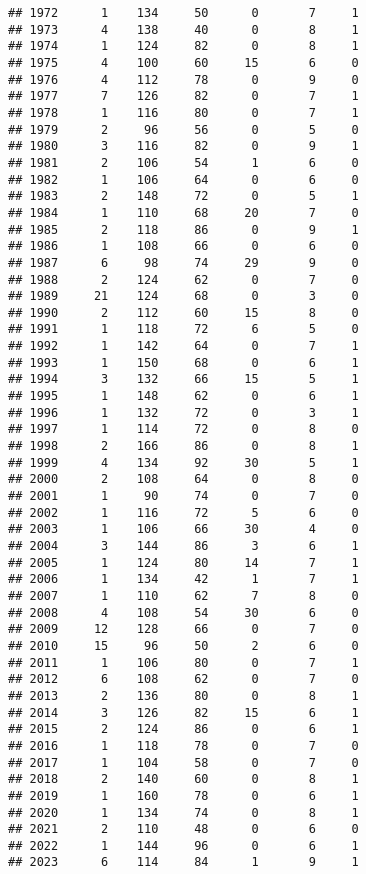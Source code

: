 \documentclass[
]{article}
\begin{document}
\begin{verbatim}
## 1972      1    134     50      0       7     1
## 1973      4    138     40      0       8     1
## 1974      1    124     82      0       8     1
## 1975      4    100     60     15       6     0
## 1976      4    112     78      0       9     0
## 1977      7    126     82      0       7     1
## 1978      1    116     80      0       7     1
## 1979      2     96     56      0       5     0
## 1980      3    116     82      0       9     1
## 1981      2    106     54      1       6     0
## 1982      1    106     64      0       6     0
## 1983      2    148     72      0       5     1
## 1984      1    110     68     20       7     0
## 1985      2    118     86      0       9     1
## 1986      1    108     66      0       6     0
## 1987      6     98     74     29       9     0
## 1988      2    124     62      0       7     0
## 1989     21    124     68      0       3     0
## 1990      2    112     60     15       8     0
## 1991      1    118     72      6       5     0
## 1992      1    142     64      0       7     1
## 1993      1    150     68      0       6     1
## 1994      3    132     66     15       5     1
## 1995      1    148     62      0       6     1
## 1996      1    132     72      0       3     1
## 1997      1    114     72      0       8     0
## 1998      2    166     86      0       8     1
## 1999      4    134     92     30       5     1
## 2000      2    108     64      0       8     0
## 2001      1     90     74      0       7     0
## 2002      1    116     72      5       6     0
## 2003      1    106     66     30       4     0
## 2004      3    144     86      3       6     1
## 2005      1    124     80     14       7     1
## 2006      1    134     42      1       7     1
## 2007      1    110     62      7       8     0
## 2008      4    108     54     30       6     0
## 2009     12    128     66      0       7     0
## 2010     15     96     50      2       6     0
## 2011      1    106     80      0       7     1
## 2012      6    108     62      0       7     0
## 2013      2    136     80      0       8     1
## 2014      3    126     82     15       6     1
## 2015      2    124     86      0       6     1
## 2016      1    118     78      0       7     0
## 2017      1    104     58      0       7     0
## 2018      2    140     60      0       8     1
## 2019      1    160     78      0       6     1
## 2020      1    134     74      0       8     1
## 2021      2    110     48      0       6     0
## 2022      1    144     96      0       6     1
## 2023      6    114     84      1       9     1

\end{verbatim}
\end{document}
